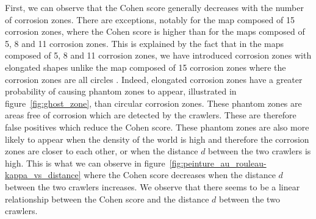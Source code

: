 First, we can observe that the Cohen score generally decreases with the number of corrosion zones.
There are exceptions, notably for the map composed of 15 corrosion zones, where the Cohen score is higher than for the maps composed of 5, 8 and 11 corrosion zones.
This is explained by the fact that in the maps composed of 5, 8 and 11 corrosion zones, we have introduced corrosion zones with elongated shapes unlike the map composed of 15 corrosion zones where the corrosion zones are all circles .
Indeed, elongated corrosion zones have a greater probability of causing phantom zones to appear, illustrated in figure~\ref{fig:ghost_zone}, than circular corrosion zones.
These phantom zones are areas free of corrosion which are detected by the crawlers.
These are therefore false positives which reduce the Cohen score.
These phantom zones are also more likely to appear when the density of the world is high and therefore the corrosion zones are closer to each other, or when the distance $d$ between the two crawlers is high.
This is what we can observe in figure~\ref{fig:peinture_au_rouleau-kappa_vs_distance} where the Cohen score decreases when the distance $d$ between the two crawlers increases.
We observe that there seems to be a linear relationship between the Cohen score and the distance $d$ between the two crawlers.

